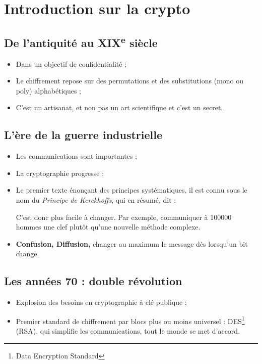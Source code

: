 \section{Introduction sur la crypto}

\subsection{De l'antiquité au XIX\textsuperscript{e} siècle}
    \begin{itemize}
        \item Dans un objectif de confidentialité ;
        \item Le chiffrement repose sur des permutations et des
            substitutions (mono ou poly) alphabétiques ;
        \item C'est un artisanat, et non pas un art scientifique
            et c'est un secret.
    \end{itemize}

\subsection{L'ère de la guerre industrielle}
    \begin{itemize}
        \item Les communications sont importantes ;
        \item La cryptographie progresse ;
        \item Le premier texte énonçant des principes systématiques,
            il est connu sous le nom du \emph{Principe de Kerckhoffs},
            qui en résumé, dit :
            
            \quad {}
            \cite{Auguste Kerckhoffs}
            
            C'est donc plus facile à changer. Par exemple, communiquer
            à 100000 hommes une clef plutôt qu'une nouvelle méthode complexe.
        \item \textbf{Confusion, Diffusion,} 
            changer au maximum le message dès lorsqu'un bit change.
    \end{itemize}
    
\subsection{Les années 70 : double révolution}
    \begin{itemize}
        \item Explosion des besoins en cryptographie à clé publique ;
        \item Premier standard de chiffrement par blocs plus ou moins
            universel : DES\footnote{Data Encryption Standard} (RSA),
            qui simplifie les communications, tout le monde se met d'accord.
    \end{itemize}
    
